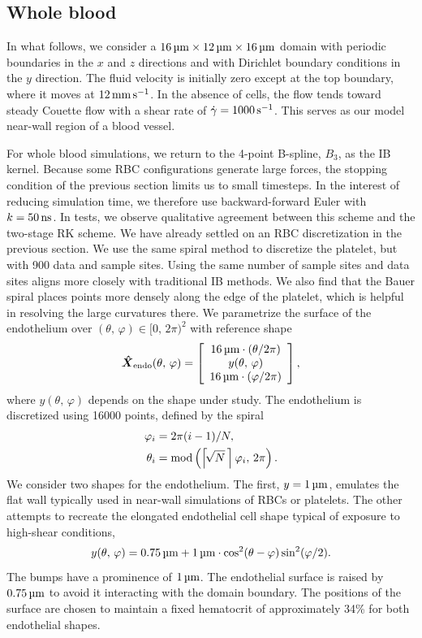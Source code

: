 \subsection{Whole blood}\label{sec:whole-blood}

In what follows, we consider a $16\um\times12\um\times16\um$ domain with periodic
boundaries in the $x$ and $z$ directions and with Dirichlet boundary conditions in the
$y$ direction. The fluid velocity is initially zero except at the top boundary, where it
moves at $12\mmpersec$. In the absence of cells, the flow tends toward steady Couette
flow with a shear rate of $\shear=1000\persec$. This serves as our model near-wall region
of a blood vessel.

For whole blood simulations, we return to the 4-point B-spline, $B_3$, as the IB kernel.
Because some RBC configurations generate large forces, the stopping condition of the
previous section limits us to small timesteps. In the interest of reducing simulation
time, we therefore use backward-forward Euler with $\timestep=50\ns$. In tests, we
observe qualitative agreement between this scheme and the two-stage RK scheme. We have
already settled on an RBC discretization in the previous section. We use the same spiral
method to discretize the platelet, but with 900 data and sample sites. Using the same
number of sample sites and data sites aligns more closely with traditional IB methods. We
also find that the Bauer spiral places points more densely along the edge of the
platelet, which is helpful in resolving the large curvatures there. We parametrize the
surface of the endothelium over $(\theta,\,\varphi)\in[0,\,2\pi)^2$ with reference shape
\begin{equation}
    \vec{\hat{X}}_\text{endo}(\theta,\,\varphi) = \left[\begin{array}{c}
            16\um\cdot(\theta/2\pi)  \\
            y(\theta,\,\varphi) \\
            16\um\cdot(\varphi/2\pi)
    \end{array}\right],
\end{equation}
where $y(\theta,\,\varphi)$ depends on the shape under study. The endothelium is
discretized using 16000 points, defined by the spiral
\begin{align*}
    \varphi_i &= 2\pi (i-1)/N, \\
    \theta_i &= \modulo\left(\left\lceil\!\sqrt{N}\mskip\thinmuskip\right\rceil\varphi_i,\,2\pi\right).
\end{align*}
We consider two shapes for the endothelium. The first, $y=1\um$, emulates the flat wall
typically used in near-wall simulations of RBCs or platelets. The other attempts to
recreate the elongated endothelial cell shape typical of exposure to high-shear
conditions,
\begin{equation*}
    y(\theta,\,\varphi) = 0.75\um + 1\um\cdot\cos^2(\theta-\varphi)\sin^2(\varphi/2).
\end{equation*}
The bumps have a prominence of $1\um$. The endothelial surface is raised by $0.75\um$ to
avoid it interacting with the domain boundary. The positions of the surface are chosen to
maintain a fixed hematocrit of approximately 34\% for both endothelial shapes.

